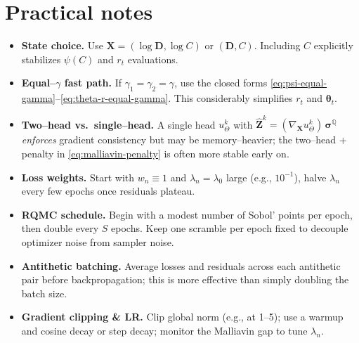 \documentclass[11pt]{article}
\newcommand{\1}{\mathbbm{1}}
\newcommand{\wh}{\widehat}
\newcommand{\bs}{\boldsymbol}
\begin{document}
\section{Practical notes}\label{sec:practical}
\begin{itemize}[leftmargin=*, itemsep=0.35em]
  \item \textbf{State choice.} Use \(\bs X=(\log \bs D, \log C)\) or \((\bs D, C)\). Including \(C\) explicitly stabilizes \(\psi(C)\) and \(r_t\) evaluations.
  \item \textbf{Equal--\(\gamma\) fast path.} If \(\gamma_1=\gamma_2=\gamma\), use the closed forms \eqref{eq:psi-equal-gamma}--\eqref{eq:theta-r-equal-gamma}. This considerably simplifies \(r_t\) and \(\bs\theta_t\).
  \item \textbf{Two--head vs.\ single--head.} A single head \(u_\Theta^k\) with \( \wh{\bs Z}^k = (\nabla_{\bs X} u^k_\Theta)\,\bs\sigma^{\mathbb{Q}} \) \emph{enforces} gradient consistency but may be memory--heavier; the two--head + penalty in \eqref{eq:malliavin-penalty} is often more stable early on.
  \item \textbf{Loss weights.} Start with \(w_n\equiv 1\) and \(\lambda_n=\lambda_0\) large (e.g., \(10^{-1}\)), halve \(\lambda_n\) every few epochs once residuals plateau.
  \item \textbf{RQMC schedule.} Begin with a modest number of Sobol' points per epoch, then double every \(S\) epochs. Keep one scramble per epoch fixed to decouple optimizer noise from sampler noise.
  \item \textbf{Antithetic batching.} Average losses and residuals across each antithetic pair before backpropagation; this is more effective than simply doubling the batch size.
  \item \textbf{Gradient clipping \& LR.} Clip global norm (e.g., at 1--5); use a warmup and cosine decay or step decay; monitor the Malliavin gap to tune \(\lambda_n\).
\end{itemize}
\end{document}
